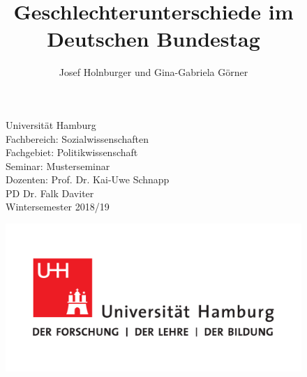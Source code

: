 \documentclass[oneside, 12pt, numbers=endperiod]{scrbook}
\title{Geschlechterunterschiede im Deutschen Bundestag}
\author{Josef Holnburger und Gina-Gabriela Görner}
\date{}
\makeatletter
\newcommand\myName{Josef Holnburger}
\newcommand\myEmail{josef@holnburger.com}
\newcommand\fachbereich{Sozialwissenschaften}
\newcommand\fachgebiet{Politikwissenschaft}
\newcommand\courseOfStudies{Musterseminar}
\newcommand\supervisorType{Dozenten} %
\newcommand\supervisor{Prof. Dr. Kai-Uwe Schnapp \\ PD Dr. Falk Daviter}
\newcommand\currentSemester{Wintersemester 2018/19}
\theoremstyle{definition}
\theoremstyle{definition}
\theoremstyle{definition}
\theoremstyle{remark}
\makeatother
\begin{document}
\maketitle


\begin{titlepage}

\setcounter{page}{-1}    

\begin{figure}[h]
	\begin{minipage}[t]{8.5cm}
	\flushleft 
			Universität Hamburg \\
			Fachbereich: \fachbereich \\
			Fachgebiet: \fachgebiet \\
			Seminar: \courseOfStudies \\ 
			\supervisorType: \supervisor \\
			\currentSemester \\
	\end{minipage}
	\hfill
   \begin{minipage}[t][2cm][b]{0.4\textwidth}
    \flushright\noindent
    	 \noindent\includegraphics{images/UHH-Logo_2010_Farbe_CMYK.pdf}
    \end{minipage}
\end{figure}


\end{titlepage}
\end{document}
